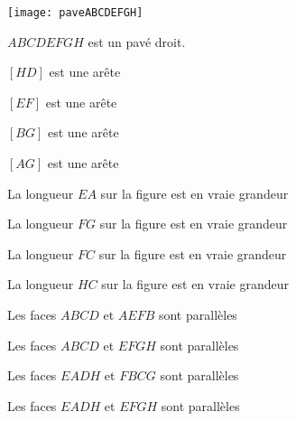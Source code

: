 

\begin{QCM}
  \begin{GroupeQCM}
  
      \begin{center} \texttt{[image: paveABCDEFGH]} \end{center}
      \begin{center} $ABCDEFGH$ est un pavé droit. \end{center}
      
    \begin{exercice}
      \begin{ChoixQCM}{4}
      \item $[HD]$ est une arête
      \item $[EF]$ est une arête
      \item $[BG]$ est une arête
      \item $[AG]$ est une arête
      \end{ChoixQCM}
\begin{corrige}
   \end{corrige}
    \end{exercice}
    
    \begin{exercice}
      \begin{ChoixQCM}{4}
      \item La longueur $EA$  sur la figure est en vraie grandeur
      \item La longueur $FG$  sur la figure est en vraie grandeur
      \item La longueur $FC$  sur la figure est en vraie grandeur
      \item La longueur $HC$  sur la figure est en vraie grandeur
      \end{ChoixQCM}
\begin{corrige}
   \end{corrige}
    \end{exercice}
    
    
     \begin{exercice}
      \begin{ChoixQCM}{4}
      \item Les faces $ABCD$ et $AEFB$ sont parallèles
      \item Les faces $ABCD$ et $EFGH$ sont parallèles
      \item Les faces $EADH$ et $FBCG$ sont parallèles
      \item Les faces $EADH$ et $EFGH$ sont parallèles
      \end{ChoixQCM}
\begin{corrige}
   \end{corrige}
    \end{exercice}
    

\end{GroupeQCM}
\end{QCM}

